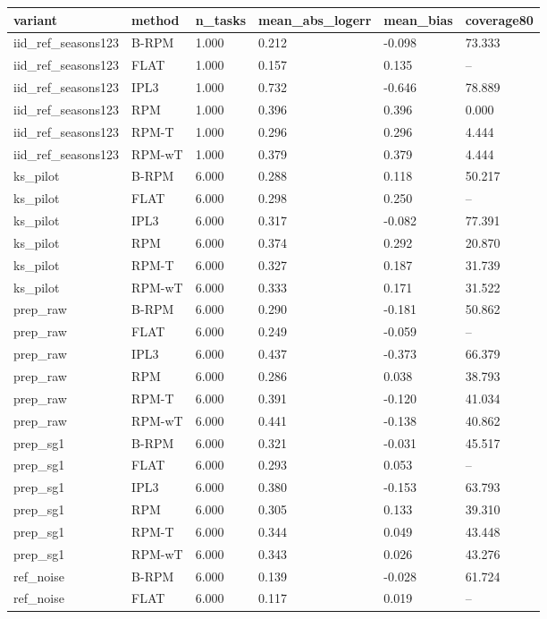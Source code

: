 \begin{tabular}{llllll}
\hline
variant & method & n\_tasks & mean\_abs\_logerr & mean\_bias & coverage80 \\
\hline
iid\_ref\_seasons123 & B-RPM & 1.000 & 0.212 & -0.098 & 73.333 \\
iid\_ref\_seasons123 & FLAT & 1.000 & 0.157 & 0.135 & – \\
iid\_ref\_seasons123 & IPL3 & 1.000 & 0.732 & -0.646 & 78.889 \\
iid\_ref\_seasons123 & RPM & 1.000 & 0.396 & 0.396 & 0.000 \\
iid\_ref\_seasons123 & RPM-T & 1.000 & 0.296 & 0.296 & 4.444 \\
iid\_ref\_seasons123 & RPM-wT & 1.000 & 0.379 & 0.379 & 4.444 \\
ks\_pilot & B-RPM & 6.000 & 0.288 & 0.118 & 50.217 \\
ks\_pilot & FLAT & 6.000 & 0.298 & 0.250 & – \\
ks\_pilot & IPL3 & 6.000 & 0.317 & -0.082 & 77.391 \\
ks\_pilot & RPM & 6.000 & 0.374 & 0.292 & 20.870 \\
ks\_pilot & RPM-T & 6.000 & 0.327 & 0.187 & 31.739 \\
ks\_pilot & RPM-wT & 6.000 & 0.333 & 0.171 & 31.522 \\
prep\_raw & B-RPM & 6.000 & 0.290 & -0.181 & 50.862 \\
prep\_raw & FLAT & 6.000 & 0.249 & -0.059 & – \\
prep\_raw & IPL3 & 6.000 & 0.437 & -0.373 & 66.379 \\
prep\_raw & RPM & 6.000 & 0.286 & 0.038 & 38.793 \\
prep\_raw & RPM-T & 6.000 & 0.391 & -0.120 & 41.034 \\
prep\_raw & RPM-wT & 6.000 & 0.441 & -0.138 & 40.862 \\
prep\_sg1 & B-RPM & 6.000 & 0.321 & -0.031 & 45.517 \\
prep\_sg1 & FLAT & 6.000 & 0.293 & 0.053 & – \\
prep\_sg1 & IPL3 & 6.000 & 0.380 & -0.153 & 63.793 \\
prep\_sg1 & RPM & 6.000 & 0.305 & 0.133 & 39.310 \\
prep\_sg1 & RPM-T & 6.000 & 0.344 & 0.049 & 43.448 \\
prep\_sg1 & RPM-wT & 6.000 & 0.343 & 0.026 & 43.276 \\
ref\_noise & B-RPM & 6.000 & 0.139 & -0.028 & 61.724 \\
ref\_noise & FLAT & 6.000 & 0.117 & 0.019 & – \\

\end{tabular}
